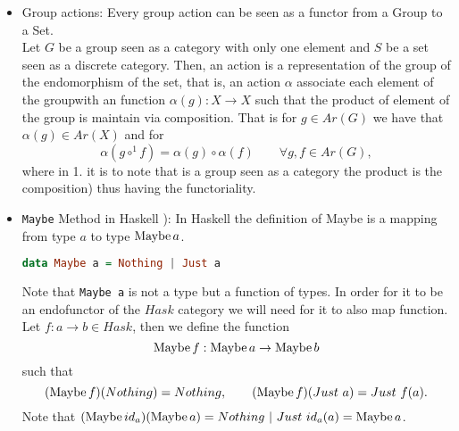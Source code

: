 \begin{example}
\begin{itemize}





\item Group actions:\label{group-action} Every group action can be seen as a functor from a Group to a Set.\\

  Let $G$ be a group seen as a category with only one element and $S$ be a set seen as a discrete category. Then, an action is a representation of the group of the endomorphism of the set, that is, an action $\alpha$ associate each element of the groupwith an function $\alpha(g):X\to X$ such that the product of element of the group is maintain via composition. That is for $g\in Ar(G)$ we have that $\alpha(g) \in Ar(X)$  and for $$\alpha(g\circ^1 f) = \alpha(g) \circ \alpha(f) \qquad \forall g,f\in Ar(G),$$ where in 1. it is to note that is a group seen as a category the product is the composition) thus having the functoriality.\\
  
\item \texttt{Maybe} Method in Haskell \cite[Section 7.1]{milewski2018category}): In Haskell the definition of Maybe is a mapping from type $a$ to type $\operatorname{Maybe}  a$.
  
\begin{lstlisting}[language=Haskell,caption={Declaration of Maybe},captionpos=b]
         data Maybe a = Nothing | Just a
       \end{lstlisting}

       Note that \texttt{Maybe a} is not a type but a function of types. In order for it to be an endofunctor of the $Hask$ category we will need for it to also map function. Let $f: a \to b\in Hask$, then we define the function
       $$\operatorname{Maybe}  f: \operatorname{Maybe} a \to \operatorname{Maybe} b$$
such that
$$(\operatorname{Maybe}  f) (Nothing) = Nothing, \qquad (\operatorname{Maybe} f) (Just\  a) = Just\  f(a).$$
Note that $(\operatorname{Maybe} id_a) (\operatorname{Maybe} a) = Nothing\  |\  Just\  id_a(a) =  \operatorname{Maybe} a$.
     \end{itemize}
\end{example}



